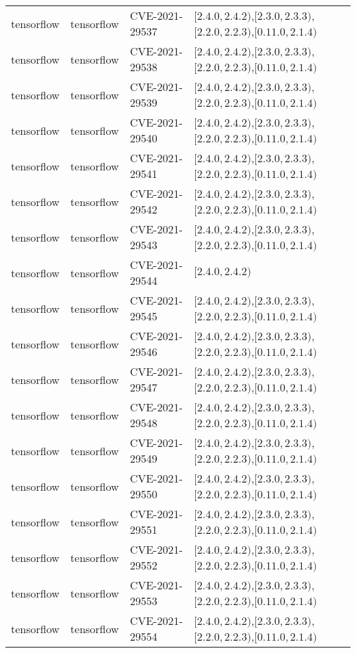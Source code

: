 \begin{tabular}{llll}
tensorflow & tensorflow & CVE-2021-29537 & $[2.4.0,2.4.2)$,$[2.3.0,2.3.3)$,$[2.2.0,2.2.3)$,$[0.11.0,2.1.4)$ \\
tensorflow & tensorflow & CVE-2021-29538 & $[2.4.0,2.4.2)$,$[2.3.0,2.3.3)$,$[2.2.0,2.2.3)$,$[0.11.0,2.1.4)$ \\
tensorflow & tensorflow & CVE-2021-29539 & $[2.4.0,2.4.2)$,$[2.3.0,2.3.3)$,$[2.2.0,2.2.3)$,$[0.11.0,2.1.4)$ \\
tensorflow & tensorflow & CVE-2021-29540 & $[2.4.0,2.4.2)$,$[2.3.0,2.3.3)$,$[2.2.0,2.2.3)$,$[0.11.0,2.1.4)$ \\
tensorflow & tensorflow & CVE-2021-29541 & $[2.4.0,2.4.2)$,$[2.3.0,2.3.3)$,$[2.2.0,2.2.3)$,$[0.11.0,2.1.4)$ \\
tensorflow & tensorflow & CVE-2021-29542 & $[2.4.0,2.4.2)$,$[2.3.0,2.3.3)$,$[2.2.0,2.2.3)$,$[0.11.0,2.1.4)$ \\
tensorflow & tensorflow & CVE-2021-29543 & $[2.4.0,2.4.2)$,$[2.3.0,2.3.3)$,$[2.2.0,2.2.3)$,$[0.11.0,2.1.4)$ \\
tensorflow & tensorflow & CVE-2021-29544 & $[2.4.0,2.4.2)$ \\
tensorflow & tensorflow & CVE-2021-29545 & $[2.4.0,2.4.2)$,$[2.3.0,2.3.3)$,$[2.2.0,2.2.3)$,$[0.11.0,2.1.4)$ \\
tensorflow & tensorflow & CVE-2021-29546 & $[2.4.0,2.4.2)$,$[2.3.0,2.3.3)$,$[2.2.0,2.2.3)$,$[0.11.0,2.1.4)$ \\
tensorflow & tensorflow & CVE-2021-29547 & $[2.4.0,2.4.2)$,$[2.3.0,2.3.3)$,$[2.2.0,2.2.3)$,$[0.11.0,2.1.4)$ \\
tensorflow & tensorflow & CVE-2021-29548 & $[2.4.0,2.4.2)$,$[2.3.0,2.3.3)$,$[2.2.0,2.2.3)$,$[0.11.0,2.1.4)$ \\
tensorflow & tensorflow & CVE-2021-29549 & $[2.4.0,2.4.2)$,$[2.3.0,2.3.3)$,$[2.2.0,2.2.3)$,$[0.11.0,2.1.4)$ \\
tensorflow & tensorflow & CVE-2021-29550 & $[2.4.0,2.4.2)$,$[2.3.0,2.3.3)$,$[2.2.0,2.2.3)$,$[0.11.0,2.1.4)$ \\
tensorflow & tensorflow & CVE-2021-29551 & $[2.4.0,2.4.2)$,$[2.3.0,2.3.3)$,$[2.2.0,2.2.3)$,$[0.11.0,2.1.4)$ \\
tensorflow & tensorflow & CVE-2021-29552 & $[2.4.0,2.4.2)$,$[2.3.0,2.3.3)$,$[2.2.0,2.2.3)$,$[0.11.0,2.1.4)$ \\
tensorflow & tensorflow & CVE-2021-29553 & $[2.4.0,2.4.2)$,$[2.3.0,2.3.3)$,$[2.2.0,2.2.3)$,$[0.11.0,2.1.4)$ \\
tensorflow & tensorflow & CVE-2021-29554 & $[2.4.0,2.4.2)$,$[2.3.0,2.3.3)$,$[2.2.0,2.2.3)$,$[0.11.0,2.1.4)$ \\

\end{tabular}

